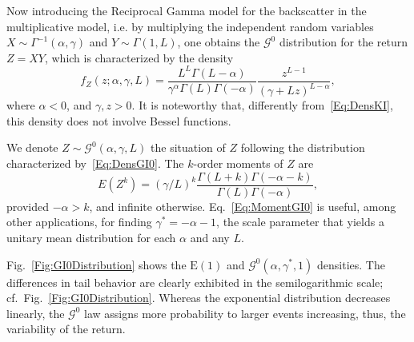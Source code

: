 \documentclass{beamer}
\begin{document}
\begin{frame}
Now introducing the Reciprocal Gamma model for the backscatter in the multiplicative model, i.e. by multiplying the independent random variables $X\sim{\Gamma^{-1}}(\alpha,\gamma)$ and $Y\sim\Gamma(1,L)$, one obtains the $\mathcal{G}^0$ distribution for the return $Z=XY$, which is characterized by the density
\begin{equation}
f_Z(z; \alpha,\gamma,L) = \frac{L^L \Gamma(L-\alpha)}{\gamma^\alpha \Gamma(L)\Gamma(-\alpha)} \frac{z^{L-1}}{(\gamma+L z)^{L-\alpha}},
\label{Eq:DensGI0}
\end{equation}
where $\alpha<0$, and $\gamma,z>0$.
It is noteworthy that, differently from~\eqref{Eq:DensKI}, this density does not involve Bessel functions.

We denote $Z\sim \mathcal G^0(\alpha,\gamma,L)$ the situation of $Z$ following the distribution characterized by~\eqref{Eq:DensGI0}.
The $k$-order moments of $Z$ are
\begin{equation}
E(Z^k) = (\gamma / L)^{k} \frac{\Gamma(L+k)\Gamma(-\alpha-k)}{\Gamma(L)\Gamma(-\alpha)},
\label{Eq:MomentGI0}
\end{equation}
provided $-\alpha>k$, and infinite otherwise.
Eq.~\eqref{Eq:MomentGI0} is useful, among other applications, for finding $\gamma^*=-\alpha-1$, the scale parameter that yields a unitary mean distribution for each $\alpha$ and any $L$.
\end{frame}


\begin{frame}
Fig.~\ref{Fig:GI0Distribution} shows the $\text{E}(1)$ and $\mathcal G^0(\alpha,\gamma^*, 1)$ densities.
The differences in tail behavior are clearly exhibited in the semilogarithmic scale; cf.\ Fig.~\ref{Fig:GI0Distribution}.
Whereas the exponential distribution decreases linearly, the $\mathcal G^0$ law assigns more probability to larger events increasing, thus, the variability of the return.
\end{frame}
\end{document}
